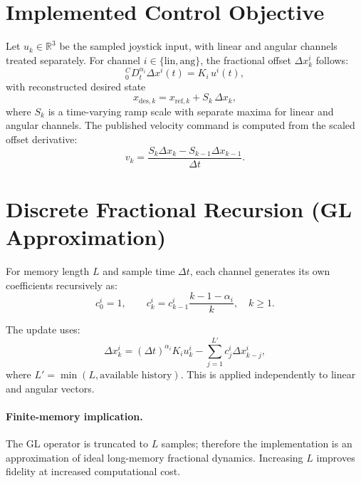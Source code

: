 \documentclass[11pt,a4paper]{article}
\begin{document}
\section{Implemented Control Objective}
Let $u_k \in \mathbb{R}^3$ be the sampled joystick input, with linear and angular channels treated separately.
For channel $i \in \{\mathrm{lin},\mathrm{ang}\}$, the fractional offset $\Delta x^i_k$ follows:
\begin{equation}
{}^{C}_{0}D_t^{\alpha_i} \Delta x^i(t) = K_i\,u^i(t),
\end{equation}
with reconstructed desired state
\begin{equation}
x_{\mathrm{des},k} = x_{\mathrm{ref},k} + S_k\,\Delta x_k,
\end{equation}
where $S_k$ is a time-varying ramp scale with separate maxima for linear and angular channels.
The published velocity command is computed from the scaled offset derivative:
\begin{equation}
v_k = \frac{S_k\Delta x_k - S_{k-1}\Delta x_{k-1}}{\Delta t}.
\end{equation}

\section{Discrete Fractional Recursion (GL Approximation)}
For memory length $L$ and sample time $\Delta t$, each channel generates its own coefficients recursively as:
\begin{equation}
c^i_0 = 1, \qquad
c^i_k = c^i_{k-1}\frac{k-1-\alpha_i}{k}, \quad k \ge 1.
\end{equation}

The update uses:
\begin{equation}
\Delta x^i_k = (\Delta t)^{\alpha_i}K_i u^i_k - \sum_{j=1}^{L'} c^i_j \Delta x^i_{k-j},
\end{equation}
where $L' = \min(L,\text{available history})$. This is applied independently to linear and angular vectors.

\paragraph{Finite-memory implication.}
The GL operator is truncated to $L$ samples; therefore the implementation is an approximation of ideal long-memory
fractional dynamics. Increasing $L$ improves fidelity at increased computational cost.
\end{document}
